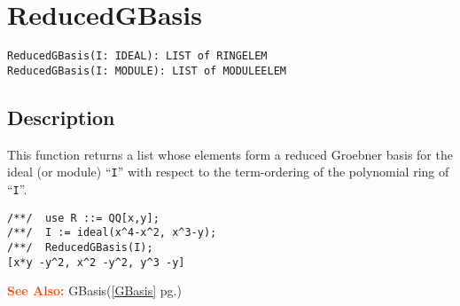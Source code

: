 \documentclass[a4paper]{mybook}
\newenvironment{command}{}{} %
\newcommand\SeeAlso{\par\textcolor{OrangeRed}{\textbf{\large See Also: }}}
\begin{document}
\section{ReducedGBasis}
\label{ReducedGBasis}
\begin{command} %


\begin{Verbatim}[label=syntax, rulecolor=\color{MidnightBlue},
frame=single]
ReducedGBasis(I: IDEAL): LIST of RINGELEM
ReducedGBasis(I: MODULE): LIST of MODULEELEM
\end{Verbatim}


\subsection*{Description}

This function returns a list whose elements form a reduced Groebner
basis for the ideal (or module) ``\verb&I&'' with respect to the term-ordering
of the polynomial ring of ``\verb&I&''.
\begin{Verbatim}[label=example, rulecolor=\color{PineGreen}, frame=single]
/**/  use R ::= QQ[x,y];
/**/  I := ideal(x^4-x^2, x^3-y);
/**/  ReducedGBasis(I);
[x*y -y^2, x^2 -y^2, y^3 -y]
\end{Verbatim}


\SeeAlso %
  GBasis(\ref{GBasis} pg.\pageref{GBasis})
\end{command} %
\end{document}
